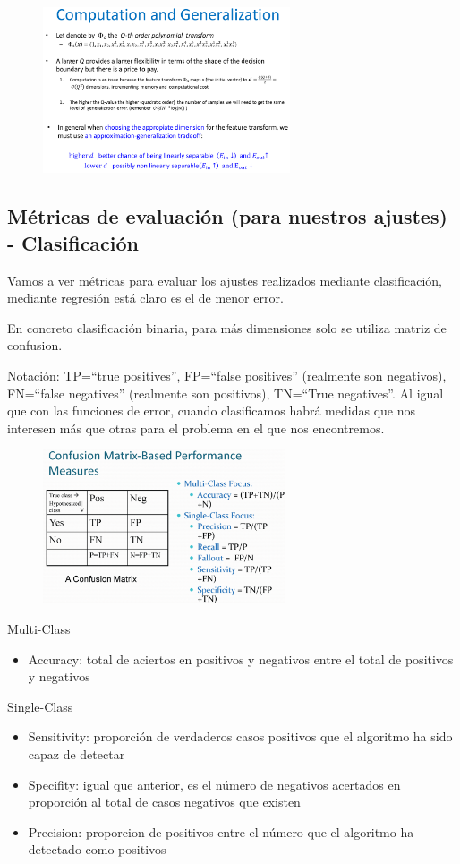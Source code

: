 \documentclass[11pt,a4paper]{article}
\theoremstyle{definition}
\begin{document}
	\begin{figure}[H]
		\centering
		\includegraphics[width=0.65\textwidth]{images/q_pol_generalization}
	\end{figure}
	
	\subsection{Métricas de evaluación (para nuestros ajustes) - Clasificación}
	Vamos a ver métricas para evaluar los ajustes realizados mediante clasificación, mediante regresión está claro es el de menor error.
	
	En concreto clasificación binaria, para más dimensiones solo se utiliza matriz de confusion.
	
	Notación: TP=``true positives'', FP=``false positives'' (realmente son negativos), FN=``false negatives'' (realmente son positivos), TN=``True negatives''. Al igual que con las funciones de error, cuando clasificamos habrá medidas que nos interesen más que otras para el problema en el que nos encontremos.
	\begin{figure}[H]
		\centering
		\includegraphics[width=0.64\textwidth]{images/confusion_matrix}
	\end{figure}
	Multi-Class
	\begin{itemize}
		\item Accuracy: total de aciertos en positivos y negativos entre el total de positivos y negativos
	\end{itemize}
	Single-Class
	\begin{itemize}
		\item Sensitivity: proporción de verdaderos casos positivos que el algoritmo ha sido capaz de detectar
		\item Specifity: igual que anterior, es el número de negativos acertados en proporción al total de casos negativos que existen
		\item Precision: proporcion de positivos entre el número que el algoritmo ha detectado como positivos
	\end{itemize}
\end{document}

